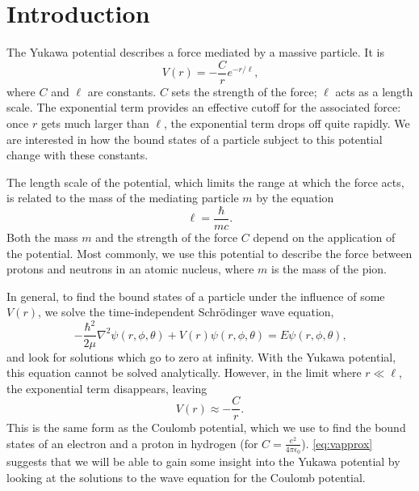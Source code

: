 \documentclass[12pt,twoside]{reedthesis}
\newcommand{\eqn}[1]{\begin{equation}#1\end{equation}}
\begin{document}
  \mainmatter %
  \pagestyle{fancyplain} %


    \chapter*{Introduction}

The Yukawa potential describes a force mediated by a massive particle. It is %
\eqn{
V(r) = -\frac{C}{r}e^{-r/\ell}\mbox{,}
}
where $C$ and $\ell$ are constants. $C$ sets the strength of the force; $\ell$ acts as a length scale. The exponential term provides an effective cutoff for the associated force: once $r$ gets much larger than $\ell$, the exponential term drops off quite rapidly. We are interested in how the bound states of a particle subject to this potential change with these constants. 

The length scale of the potential, which limits the range at which the force acts, is related to the mass of the mediating particle $m$ by the equation\eqn{
\ell = \frac{\hbar}{m c}\mbox{.}
\label{eq:ell}
}
Both the mass $m$ and the strength of the force $C$ depend on the application of the potential. Most commonly, we use this potential to describe the force between protons and neutrons in an atomic nucleus, where $m$ is the mass of the pion.
 
In general, to find the bound states of a particle under the influence of some $V(r)$, we solve the time-independent Schr\"odinger wave equation,
\eqn{
-\frac{\hbar^2}{2\mu}\nabla^2\psi(r,\phi,\theta) + V(r)\psi (r,\phi,\theta) = E \psi(r,\phi,\theta)\mbox{,}
\label{eq:TIDSWE-general}
} and look for solutions which go to zero at infinity.
With the Yukawa potential, this equation cannot be solved analytically. However, in the limit where $r \ll \ell$, the exponential term disappears, leaving
\eqn{
V(r) \approx -\frac{C}{r}\mbox{.}
\label{eq:vapprox}
}
This is the same form as the Coulomb potential, which we use to find the bound states of an electron and a proton in hydrogen (for $C = \frac{e^2}{4\pi\epsilon_0}$). \eqref{eq:vapprox} suggests that we will be able to gain some insight into the Yukawa potential by looking at the solutions to the wave equation for the Coulomb potential. 
\end{document}
